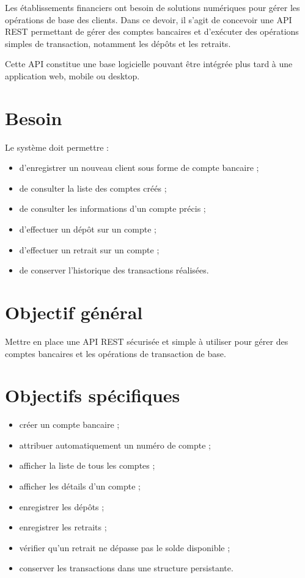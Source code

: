 \documentclass[12pt,a4paper]{article}
\begin{document}
Les établissements financiers ont besoin de solutions numériques pour gérer les opérations de base des clients. Dans ce devoir, il s'agit de concevoir une API REST permettant de gérer des comptes bancaires et d'exécuter des opérations simples de transaction, notamment les dépôts et les retraits.

Cette API constitue une base logicielle pouvant être intégrée plus tard à une application web, mobile ou desktop.

\section{Besoin}

Le système doit permettre :

\begin{itemize}
    \item d'enregistrer un nouveau client sous forme de compte bancaire ;
    \item de consulter la liste des comptes créés ;
    \item de consulter les informations d'un compte précis ;
    \item d'effectuer un dépôt sur un compte ;
    \item d'effectuer un retrait sur un compte ;
    \item de conserver l'historique des transactions réalisées.
\end{itemize}

\section{Objectif général}

Mettre en place une API REST sécurisée et simple à utiliser pour gérer des comptes bancaires et les opérations de transaction de base.

\section{Objectifs spécifiques}

\begin{itemize}
    \item créer un compte bancaire ;
    \item attribuer automatiquement un numéro de compte ;
    \item afficher la liste de tous les comptes ;
    \item afficher les détails d'un compte ;
    \item enregistrer les dépôts ;
    \item enregistrer les retraits ;
    \item vérifier qu'un retrait ne dépasse pas le solde disponible ;
    \item conserver les transactions dans une structure persistante.
\end{itemize}
\end{document}
